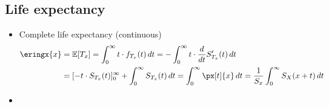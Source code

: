 \subsection{Life expectancy}

\begin{itemize}
\item Complete life expectancy (continuous)
\begin{align*}
\eringx{x} &= \mathbb{E}[T_x] = \int_0^{\infty} t\cdot f_{T_x}(t)\,dt = -\int_0^{\infty} t\cdot\frac{d}{dt}S_{T_x}'(t)\,dt \\
&= [-t\cdot S_{T_x}(t)]_0^{\infty} + \int_0^{\infty} S_{T_x}(t)\,dt = \int_0^{\infty} \px[t]{x}\,dt = \frac{1}{S_x}\int_0^{\infty} S_X(x + t)\,dt
\end{align*}
\item 
\end{itemize}